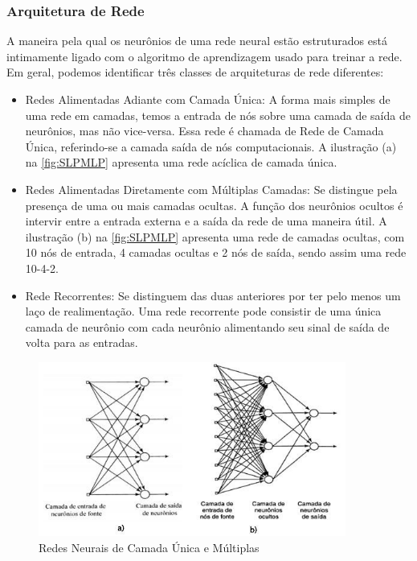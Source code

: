 \subsubsection{Arquitetura de Rede}
A maneira pela qual os neurônios de uma rede neural estão estruturados está intimamente ligado com o algoritmo de aprendizagem usado para treinar a rede. Em geral, podemos identificar três classes de arquiteturas de rede diferentes:
    \begin{itemize}
        \item Redes Alimentadas Adiante com Camada Única: A forma mais simples de uma rede em camadas, temos a entrada de nós sobre uma camada de saída de neurônios, mas não vice-versa. Essa rede é chamada de Rede de Camada Única, referindo-se a camada saída de nós computacionais. A ilustração (a) na \autoref{fig:SLPMLP} apresenta uma rede acíclica de camada única.
        \item Redes Alimentadas Diretamente com Múltiplas Camadas: Se distingue pela presença de uma ou mais camadas ocultas. A função dos neurônios ocultos é intervir entre a entrada externa e a saída da rede de uma maneira útil. A ilustração (b) na \autoref{fig:SLPMLP} apresenta uma rede de camadas ocultas, com 10 nós de entrada, 4 camadas ocultas e 2 nós de saída, sendo assim uma rede 10-4-2.
        \item Rede Recorrentes: Se distinguem das duas anteriores por ter pelo menos um laço de realimentação. Uma rede recorrente pode consistir de uma única camada de neurônio com cada neurônio alimentando seu sinal de saída de volta para as entradas.
    \end{itemize}
    
    \begin{figure}
    \centering
    \includegraphics[width=0.9\textwidth]{modelo-monografia-rej-2018/img/Figura-1-a-Rede-de-camada-unica-b-Rede-de-multiplas-camadas.png}
    \caption{Redes Neurais de Camada Única e Múltiplas}
    \label{fig:SLPMLP}
    \end{figure}

